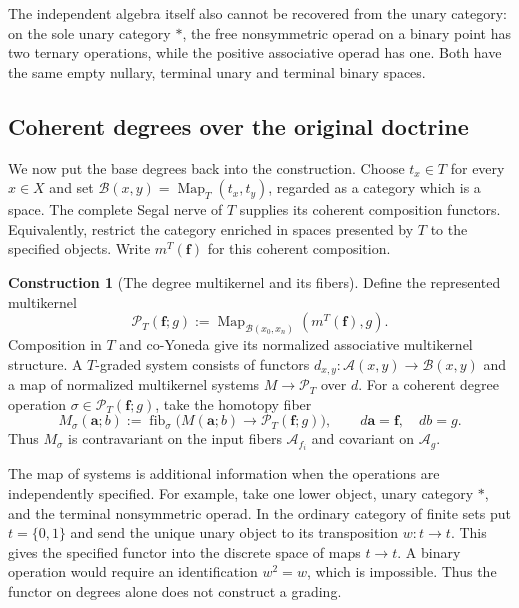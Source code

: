 \documentclass[oneside]{article}
\theoremstyle{plain}
\theoremstyle{definition}
\newtheorem{construction}[theorem]{Construction}
\theoremstyle{remark}
\newcommand{\Map}{\operatorname{Map}}
\newcommand{\fib}{\operatorname{fib}}
\begin{document}
The independent algebra itself also cannot be recovered from the unary
category: on the sole unary category $*$, the free nonsymmetric operad
on a binary point has two ternary operations, while the positive
associative operad has one. Both have the same empty nullary, terminal
unary and terminal binary spaces.

\subsection{Coherent degrees over the original doctrine}
\label{subsec:graded-multikernels}

We now put the base degrees back into the construction. Choose
$t_x\in T$ for every $x\in X$ and set
$\mathcal B(x,y)=\Map_T(t_x,t_y)$, regarded as a category which is
a space. The complete Segal nerve of $T$ supplies its coherent
composition functors. Equivalently, restrict the category enriched
in spaces presented by $T$ to the specified objects. Write
$m^T(\mathbf f)$ for this coherent composition.

\begin{construction}[The degree multikernel and its fibers]
\label{con:degree-multikernel}
Define the represented multikernel
\[
 \mathcal P_T(\mathbf f;g)
 :=\Map_{\mathcal B(x_0,x_n)}(m^T(\mathbf f),g).
\]
Composition in $T$ and co-Yoneda give its normalized associative
multikernel structure. A $T$-graded system consists of functors
$d_{x,y}:\mathcal A(x,y)\to\mathcal B(x,y)$ and a map of
normalized multikernel systems $M\to\mathcal P_T$ over $d$.
For a coherent degree operation
$\sigma\in\mathcal P_T(\mathbf f;g)$, take the homotopy fiber
\begin{equation}\label{eq:graded-independent-multikernel}
 M_\sigma(\mathbf a;b)
 :=\fib_\sigma\bigl(M(\mathbf a;b)
       \longrightarrow\mathcal P_T(\mathbf f;g)\bigr),
 \qquad d\mathbf a=\mathbf f,\quad db=g.
\end{equation}
Thus $M_\sigma$ is contravariant on the input fibers
$\mathcal A_{f_i}$ and covariant on $\mathcal A_g$.
\end{construction}

The map of systems is additional information when the operations are
independently specified. For example, take one lower object, unary
category $*$, and the terminal nonsymmetric operad. In the ordinary
category of finite sets put $t=\{0,1\}$ and send the unique unary
object to its transposition $w:t\to t$. This gives the specified
functor into the discrete space of maps $t\to t$. A binary operation
would require an identification $w^2=w$, which is impossible. Thus
the functor on degrees alone does not construct a grading.
\end{document}

